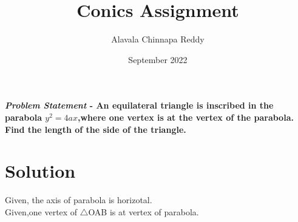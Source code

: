 \documentclass[journal,10pt,twocolumn]{article}
\title{\textbf{Conics Assignment}}
\author{Alavala Chinnapa Reddy}
\date{September 2022}
\begin{document}
\maketitle
\paragraph{\textit{Problem Statement} - An equilateral triangle is inscribed in the parabola $y^{2} = 4ax$,where one vertex is at the vertex of the parabola. Find the length of the side of the triangle.} \vspace{5mm}
\section*{\large Solution}


Given, the axis of parabola is horizotal.
\\ Given,one vertex of $\triangle$OAB is at vertex of parabola.
\end{document}

